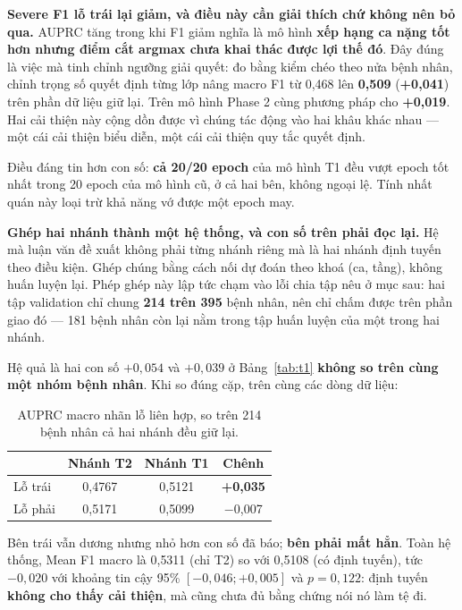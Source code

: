 \documentclass[11pt,a4paper]{article}
\newcommand{\up}[1]{\textcolor{teal!70!black}{\textbf{#1}}}
\newcommand{\down}[1]{\textcolor{red!65!black}{#1}}
\begin{document}
\textbf{Severe F1 lỗ trái lại giảm, và điều này cần giải thích chứ không nên bỏ qua.} AUPRC tăng
trong khi F1 giảm nghĩa là mô hình \textbf{xếp hạng ca nặng tốt hơn nhưng điểm cắt argmax chưa
khai thác được lợi thế đó}. Đây đúng là việc mà tinh chỉnh ngưỡng giải quyết: đo bằng kiểm chéo
theo nửa bệnh nhân, chỉnh trọng số quyết định từng lớp nâng macro F1 từ 0{,}468 lên
\textbf{0{,}509} (\up{+0{,}041}) trên phần dữ liệu giữ lại. Trên mô hình Phase 2 cùng phương pháp
cho \up{+0{,}019}. Hai cải thiện này cộng dồn được vì chúng tác động vào hai khâu khác nhau ---
một cái cải thiện biểu diễn, một cái cải thiện quy tắc quyết định.

Điều đáng tin hơn con số: \textbf{cả 20/20 epoch} của mô hình T1 đều vượt epoch tốt nhất trong
20 epoch của mô hình cũ, ở cả hai bên, không ngoại lệ. Tính nhất quán này loại trừ khả năng
vớ được một epoch may.

\textbf{Ghép hai nhánh thành một hệ thống, và con số trên phải đọc lại.} Hệ mà luận văn đề xuất
không phải từng nhánh riêng mà là hai nhánh định tuyến theo điều kiện. Ghép chúng bằng cách nối dự
đoán theo khoá (ca, tầng), không huấn luyện lại. Phép ghép này lập tức chạm vào lỗi chia tập nêu ở
mục sau: hai tập validation chỉ chung \textbf{214 trên 395} bệnh nhân, nên chỉ chấm được trên phần
giao đó --- 181 bệnh nhân còn lại nằm trong tập huấn luyện của một trong hai nhánh.

Hệ quả là hai con số $+0{,}054$ và $+0{,}039$ ở Bảng~\ref{tab:t1} \textbf{không so trên cùng một
nhóm bệnh nhân}. Khi so đúng cặp, trên cùng các dòng dữ liệu:

\begin{table}[htbp]
\centering\small
\caption{AUPRC macro nhãn lỗ liên hợp, so trên 214 bệnh nhân cả hai nhánh đều giữ lại.}
\label{tab:matched}
\begin{tabular}{lccc}
\toprule
 & \textbf{Nhánh T2} & \textbf{Nhánh T1} & \textbf{Chênh} \\
\midrule
Lỗ trái  & 0{,}4767 & 0{,}5121 & \up{+0{,}035} \\
Lỗ phải  & 0{,}5171 & 0{,}5099 & \down{$-$0{,}007} \\
\bottomrule
\end{tabular}
\end{table}

Bên trái vẫn dương nhưng nhỏ hơn con số đã báo; \textbf{bên phải mất hẳn}. Toàn hệ thống, Mean F1
macro là 0{,}5311 (chỉ T2) so với 0{,}5108 (có định tuyến), tức $-0{,}020$ với khoảng tin cậy 95\%
$[-0{,}046; +0{,}005]$ và $p = 0{,}122$: định tuyến \textbf{không cho thấy cải thiện}, mà cũng chưa
đủ bằng chứng nói nó làm tệ đi.
\end{document}
